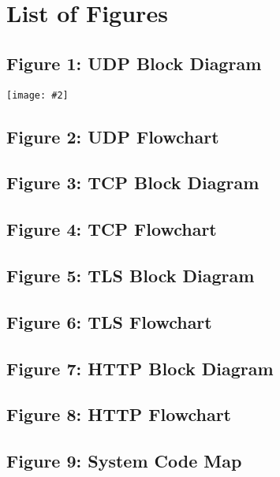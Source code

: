 \newcommand*{\MyIncludeGraphics}[2][]{%
\begin{adjustbox}{max size={\textwidth}{\textheight}}
    \texttt{[image: \#2]}%
\end{adjustbox}
}

\chapter{List of Figures}

\section*{Figure 1: UDP Block Diagram}
\centering
\MyIncludeGraphics{UDP_Flowchart.drawio.png}


\section*{Figure 2: UDP Flowchart}
\vspace{1cm}

\section*{Figure 3: TCP Block Diagram}
\vspace{1cm}

\section*{Figure 4: TCP Flowchart}
\vspace{1cm}

\section*{Figure 5: TLS Block Diagram}
\vspace{1cm}

\section*{Figure 6: TLS Flowchart}
\vspace{1cm}

\section*{Figure 7: HTTP Block Diagram}
\vspace{1cm}

\section*{Figure 8: HTTP Flowchart}
\vspace{1cm}

\section*{Figure 9: System Code Map}
\vspace{1cm}

\endgroup